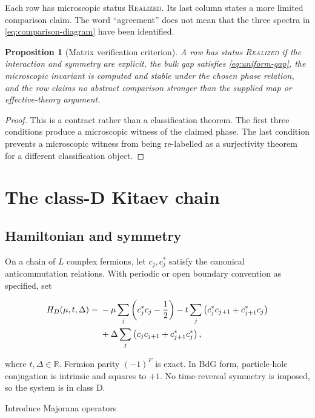 \documentclass[12pt]{article}
\newtheorem{proposition}[theorem]{Proposition}
\theoremstyle{definition}
\theoremstyle{remark}
\newcommand{\REAL}{\textnormal{\textsc{Realized}}}
\begin{document}
Each row has microscopic status \REAL{}.  Its last column states a more
limited comparison claim.  The word ``agreement'' does not mean that the
three spectra in \cref{eq:comparison-diagram} have been identified.

\begin{proposition}[Matrix verification criterion]
\label{prop:matrix-criterion}
A row has status \REAL{} if the interaction and symmetry are explicit, the
bulk gap satisfies \cref{eq:uniform-gap}, the microscopic invariant is
computed and stable under the chosen phase relation, and the row claims no
abstract comparison stronger than the supplied map or effective-theory
argument.
\end{proposition}

\begin{proof}
This is a contract rather than a classification theorem.  The first three
conditions produce a microscopic witness of the claimed phase.  The last
condition prevents a microscopic witness from being re-labelled as a
surjectivity theorem for a different classification object.
\end{proof}

\section{The class-D Kitaev chain}
\label{sec:kitaev}

\subsection{Hamiltonian and symmetry}

On a chain of $L$ complex fermions, let $c_j,c_j^*$ satisfy the canonical
anticommutation relations.  With periodic or open boundary convention as
specified, set

\begin{align}
H_D(\mu,t,\Delta)
={}&-\mu\sum_j\left(c_j^*c_j-\frac12\right)
-t\sum_j\left(c_j^*c_{j+1}+c_{j+1}^*c_j\right) \notag\\
&+\Delta\sum_j\left(c_jc_{j+1}+c_{j+1}^*c_j^*\right),
\label{eq:kitaev-hamiltonian}
\end{align}

where $t,\Delta\in\mathbb R$.  Fermion parity $(-1)^F$ is exact.  In BdG
form, particle-hole conjugation is intrinsic and squares to $+1$.  No
time-reversal symmetry is imposed, so the system is in class D.

Introduce Majorana operators
\end{document}
